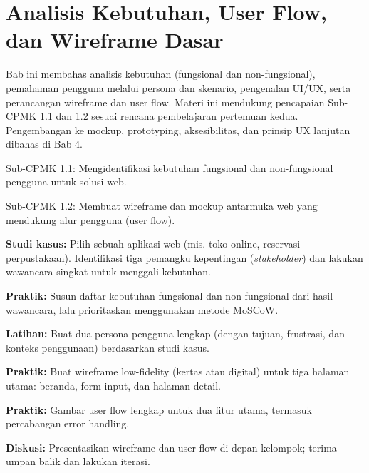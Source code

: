 \documentclass[../main.tex]{subfiles}
\begin{document}
\chapter{Analisis Kebutuhan, User Flow, dan Wireframe Dasar}

Bab ini membahas analisis kebutuhan (fungsional dan non-fungsional), pemahaman pengguna melalui persona dan skenario, pengenalan UI/UX, serta perancangan wireframe dan user flow. Materi ini mendukung pencapaian Sub-CPMK 1.1 dan 1.2 sesuai rencana pembelajaran pertemuan kedua. Pengembangan ke mockup, prototyping, aksesibilitas, dan prinsip UX lanjutan dibahas di Bab 4.

\begin{subcpmk}
  \item Sub-CPMK 1.1: Mengidentifikasi kebutuhan fungsional dan non-fungsional pengguna untuk solusi web.
  \item Sub-CPMK 1.2: Membuat wireframe dan mockup antarmuka web yang mendukung alur pengguna (user flow).
\end{subcpmk}








\begin{aktivitas}
  \item \textbf{Studi kasus:} Pilih sebuah aplikasi web (mis. toko online, reservasi perpustakaan). Identifikasi tiga pemangku kepentingan (\textit{stakeholder}) dan lakukan wawancara singkat untuk menggali kebutuhan.
  \item \textbf{Praktik:} Susun daftar kebutuhan fungsional dan non-fungsional dari hasil wawancara, lalu prioritaskan menggunakan metode MoSCoW.
  \item \textbf{Latihan:} Buat dua persona pengguna lengkap (dengan tujuan, frustrasi, dan konteks penggunaan) berdasarkan studi kasus.
  \item \textbf{Praktik:} Buat wireframe low-fidelity (kertas atau digital) untuk tiga halaman utama: beranda, form input, dan halaman detail.
  \item \textbf{Praktik:} Gambar user flow lengkap untuk dua fitur utama, termasuk percabangan error handling.
  \item \textbf{Diskusi:} Presentasikan wireframe dan user flow di depan kelompok; terima umpan balik dan lakukan iterasi.
\end{aktivitas}
\end{document}
